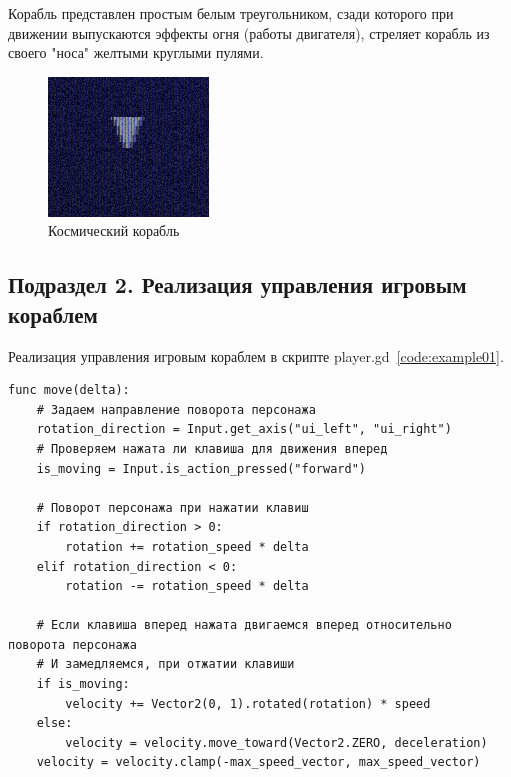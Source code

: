 Корабль представлен простым белым треугольником, сзади которого при движении выпускаются эффекты огня (работы двигателя), стреляет корабль из своего "носа" желтыми круглыми пулями.

\begin{figure}
    \centering
    \includegraphics[width=0.5\linewidth]{images/spaceship.png}
    \caption{Космический корабль}
    \label{fig:enter-label}
\end{figure}

\subsection{\label{subsec:ch02/sec01/sub02}Подраздел 2. Реализация управления игровым кораблем}


Реализация управления игровым кораблем в скрипте player.gd~\ref{code:example01}.
\begin{code}
\vspace{-\baselineskip}\begin{verbatim}
func move(delta):
    # Задаем направление поворота персонажа
    rotation_direction = Input.get_axis("ui_left", "ui_right")
    # Проверяем нажата ли клавиша для движения вперед
    is_moving = Input.is_action_pressed("forward")

    # Поворот персонажа при нажатии клавиш
    if rotation_direction > 0:
        rotation += rotation_speed * delta
    elif rotation_direction < 0:
        rotation -= rotation_speed * delta

    # Если клавиша вперед нажата двигаемся вперед относительно поворота персонажа
    # И замедляемся, при отжатии клавиши
    if is_moving:
        velocity += Vector2(0, 1).rotated(rotation) * speed
    else:
        velocity = velocity.move_toward(Vector2.ZERO, deceleration)
    velocity = velocity.clamp(-max_speed_vector, max_speed_vector)
\end{verbatim}
\end{code}

